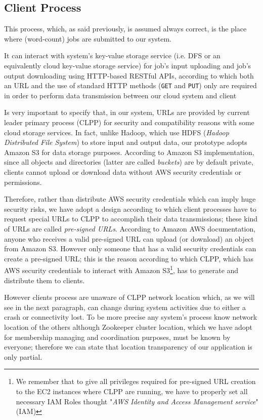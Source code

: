 \documentclass[sigchi]{acmart}
\begin{document}
\subsection{Client Process}

This process, which, as said previously, is assumed always correct, is the place where (word-count) jobs are submitted to our system. 

It can interact with system's key-value storage service (i.e. DFS or an equivalently cloud key-value storage service) for job's input uploading and job's output downloading using HTTP-based RESTful APIs, according to which both an URL and the use of standard HTTP methods (\texttt{GET} and \texttt{PUT}) only are required in order to perform data transmission between our cloud system and client

Is very important to specify that, in our system, URLs are provided by current leader primary process (CLPP) for security and compatibility reasons with some cloud storage services. In fact, unlike Hadoop, which use HDFS (\textit{Hadoop Distributed File System}) to store input and output data, our prototype adopts Amazon S3 for data storage purposes. According to Amazon S3 implementation, since all objects and directories (latter are called \textit{buckets}) are by default private, clients cannot upload or download data without AWS security credentials or permissions.

Therefore, rather than distribute AWS security credentials which can imply huge security risks, we have adopt a design according to which client processes have to request special URLs to CLPP to accomplish their data transmissions; these kind of URLs are called \textit{pre-signed URLs}. According to Amazon AWS documentation, anyone who receives a valid pre-signed URL can upload (or download) an object from Amazon S3. However only someone that has a valid security credentials can create a pre-signed URL; this is the reason according to which CLPP, which has AWS security credentials to interact with Amazon S3\footnote{We remember that to give all privileges required for pre-signed URL creation to the EC2 instances where CLPP are running, we have to properly set all necessary IAM Roles thought "\textit{AWS Identity and Access Management service}" (IAM)}, has to generate and distribute them to clients.

However clients process are unaware of CLPP network location which, as we will see in the next paragraph, can change during system activities due to either a crash or connectivity lost. To be more precise any system's process know network location of the others although Zookeeper cluster location, which we have adopt for membership managing and coordination purposes, must be known by everyone; therefore we can state that location transparency of our application is only partial. 
\end{document}
